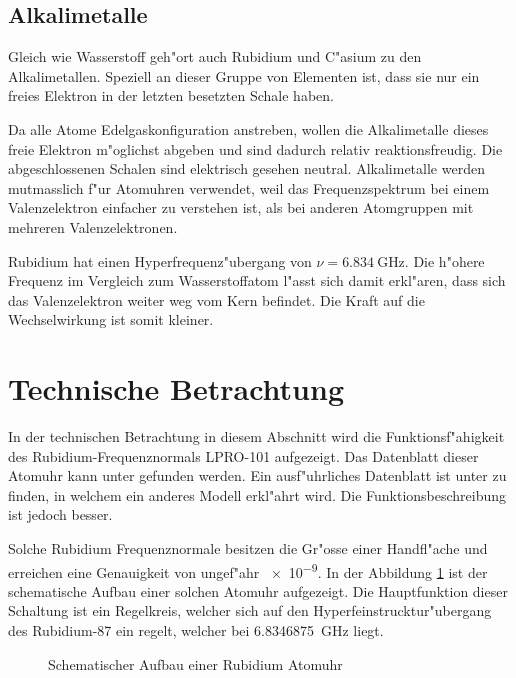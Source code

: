 \begin{refsection}
\subsection{Alkalimetalle}
%
Gleich wie Wasserstoff geh"ort auch Rubidium und C"asium zu den
%
%
Alkalimetallen. Speziell an dieser Gruppe von Elementen ist, dass sie
nur ein freies Elektron in der letzten besetzten Schale haben.

Da alle Atome Edelgaskonfiguration anstreben, wollen die Alkalimetalle
dieses freie Elektron m"oglichst abgeben und sind dadurch relativ
reaktionsfreudig.  Die abgeschlossenen Schalen sind elektrisch gesehen
neutral.  Alkalimetalle werden mutmasslich f"ur Atomuhren verwendet,
weil das Frequenzspektrum bei einem Valenzelektron einfacher zu
verstehen ist, als bei anderen Atomgruppen mit mehreren
Valenzelektronen.

Rubidium hat einen Hyperfrequenz"ubergang von $\nu =
\SI{6.834}{\giga\hertz}$. Die h"ohere Frequenz im Vergleich zum
Wasserstoffatom l"asst sich damit erkl"aren, dass sich das
Valenzelektron weiter weg vom Kern befindet.  Die Kraft auf die
Wechselwirkung ist somit kleiner.

\section{Technische Betrachtung}
In der technischen Betrachtung in diesem Abschnitt wird die
Funktionsf"ahigkeit des Rubidium-Frequenznormals LPRO-101 aufgezeigt.
%
Das Datenblatt dieser Atomuhr kann unter \cite{datasheet:lpro}
gefunden werden.  Ein ausf"uhrliches Datenblatt ist unter
\cite{datasheet:prs10m} zu finden, in welchem ein anderes Modell
erkl"ahrt wird.  Die Funktionsbeschreibung ist jedoch besser.

Solche Rubidium Frequenznormale besitzen die Gr"osse einer Handfl"ache
und erreichen eine Genauigkeit von ungef"ahr \num{e-9}.  In der
Abbildung \ref{fig:techBlock} ist der schematische Aufbau einer
solchen Atomuhr aufgezeigt.  Die Hauptfunktion dieser Schaltung ist
ein Regelkreis, welcher sich auf den Hyperfeinstrucktur"ubergang des
Rubidium-87 ein regelt, welcher bei \SI{6.8346875}{\giga\hertz} liegt.

\begin{figure}
  \centering
  
  \caption{Schematischer Aufbau einer Rubidium Atomuhr}
  \label{fig:techBlock}
\end{figure}


\end{refsection}
